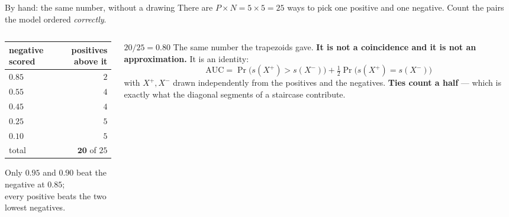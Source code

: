 \documentclass[aspectratio=169]{beamer}
\begin{document}
\begin{frame}[shrink=7]{By hand: the same number, without a drawing}
There are $P \times N = 5 \times 5 = 25$ ways to pick one positive and one
negative. Count the pairs the model ordered \emph{correctly}.
  \begin{columns}[T]
    \begin{column}{0.46\textwidth}
      \begin{center}\small
      \begin{tabular}{@{}lr@{}}
        \toprule
        negative scored & positives above it\\
        \midrule
        $0.85$ & $2$\\
        $0.55$ & $4$\\
        $0.45$ & $4$\\
        $0.25$ & $5$\\
        $0.10$ & $5$\\
        \midrule
        total & $\mathbf{20}$ of $25$\\
        \bottomrule
      \end{tabular}
      \end{center}
      \begin{center}\footnotesize
        Only $0.95$ and $0.90$ beat the negative at $0.85$;\\
        every positive beats the two lowest negatives.
      \end{center}
    \end{column}
    \begin{column}{0.50\textwidth}
      \begin{exampleblock}{$20/25 = \mathbf{0.80}$}
        \small The same number the trapezoids gave. \textbf{It is not a
        coincidence and it is not an approximation.} It is an identity:
        \[
          \mathrm{AUC} = \Pr\!\big(s(X^{+}) > s(X^{-})\big)
            + \tfrac{1}{2}\Pr\!\big(s(X^{+}) = s(X^{-})\big)
        \]
        with $X^{+}, X^{-}$ drawn independently from the positives and the
        negatives. \textbf{Ties count a half} --- which is exactly what the
        diagonal segments of a staircase contribute.
      \end{exampleblock}
    \end{column}
  \end{columns}
\end{frame}
\end{document}
